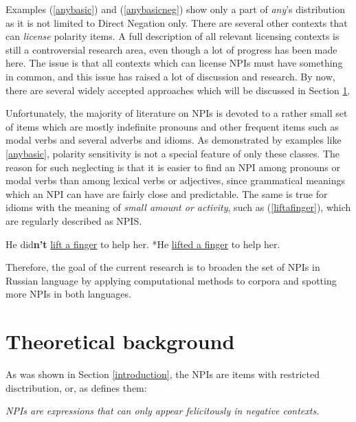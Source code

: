 \documentclass[a4paper,12pt]{article}
\begin{document}
	Examples (\ref{anybasic}) and (\ref{anybasicneg}) show only a part of \textit{any}'s distribution as it is not limited to Direct Negation only. There are several other contexts that can \textit{license} polarity items. A full description of all relevant licensing contexts is still a controversial research area, even though a lot of progress has been made here. The issue is that all contexts which can license NPIs must have something in common, and this issue has raised a lot of discussion and research. By now, there are several widely accepted approaches which will be discussed in Section \ref{background}.
    \par
	Unfortunately, the majority of literature on NPIs is devoted to a rather small set of items which are mostly indefinite pronouns and other frequent items such as modal verbs and several adverbs and idioms. As demonstrated by examples like \ref{anybasic}, polarity sensitivity is not a special feature of only these classes. The reason for such neglecting is that it is easier to find an NPI among pronouns or modal verbs than among lexical verbs or adjectives, since grammatical meanings which an NPI can have are fairly close and predictable. The same is true for idioms with the meaning of \textit{small amount or activity}, such as (\ref{liftafinger}), which are regularly described as NPIS.
    
   	\begin{exe}
		\ex \label{liftafinger}
        \begin{xlist}
			\ex 
            He did\textbf{n't} \underline{lift a finger} to help her.
			\ex 
            *He \underline{lifted a finger} to help her.
		\end{xlist}
	\end{exe}
    \par
    
	Therefore, the goal of the current research is to broaden the set of NPIs in Russian language by applying computational methods to corpora and spotting more NPIs in both languages.
	
	\section{Theoretical background}\label{background}
	As was shown in Section \ref{introduction}, the NPIs are items with restricted disctribution, or, as \parencite{vanderwouden} defines them:
    \begin{exe}
    	\ex 
        \textit{NPIs are expressions that can only appear felicitously in negative contexts.}
    \end{exe}
    
\end{document}
